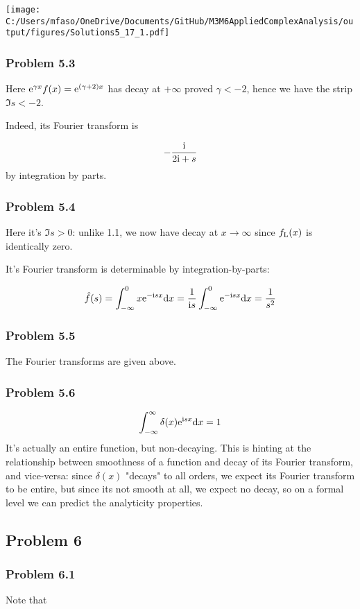 \documentclass[12pt,landscape]{article}
\def\D{ {\rm d} }
\def\I{ {\rm i} }
\def\E{ {\rm e} }
\def\dx{\D x}
\begin{document}
{\texttt{[image: C:/Users/mfaso/OneDrive/Documents/GitHub/M3M6AppliedComplexAnalysis/output/figures/Solutions5\_17\_1.pdf]}

\subsubsection{Problem 5.3}
Here $\E^{\gamma x } f(x) = \E^{(\gamma+2) x}$ has decay at $+\infty$ proved $\gamma < -2$, hence we have the strip $\Im s < -2$.

Indeed, its Fourier transform is

\[
-{\I \over 2 \I +s}
\]
by integration by parts.

\subsubsection{Problem 5.4}
Here it's $\Im s > 0$: unlike 1.1, we now have decay at $x \rightarrow \infty$ since $f_{\rm L}(x)$ is identically zero.

It's Fourier transform is determinable by integration-by-parts:

\[
\hat f(s) = \int_{-\infty}^0 x \E^{-\I s x} \dx = {1 \over \I s} \int_{-\infty}^0\E^{-\I s x} \dx = {1 \over s^2}
\]
\subsubsection{Problem 5.5}
The Fourier transforms are given above.

\subsubsection{Problem 5.6}
\[
\int_{-\infty}^\infty \delta(x) \E^{\I s x} \dx = 1
\]
It's actually an entire function, but non-decaying. This is hinting at the relationship between smoothness of a function and decay of its Fourier transform, and vice-versa: since $\delta(x)$ "decays" to all orders, we expect its Fourier transform to be entire, but since its not smooth at all, we expect no decay, so on a formal level we can predict the analyticity properties.

\subsection{Problem 6}
\subsubsection{Problem 6.1}
Note that

}
\end{document}
